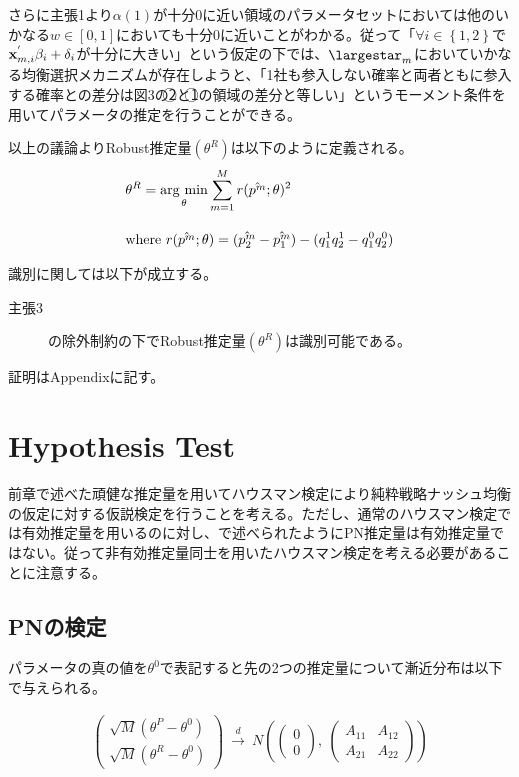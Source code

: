 \documentclass{jsarticle}
\newcommand{\argmin}{\mathop{\rm arg~min}\limits}
\begin{document}
さらに主張1より$\alpha(1)$が十分0に近い領域のパラメータセットにおいては他のいかなる$w \in [0,1]$においても十分0に近いことがわかる。従って「$\forall i \in \left\{ 1,2\right\}$で${\bf x}_{m, i}^{'} \beta_i + \delta_i$が十分に大きい」という仮定の下では、$\largestar_m$においていかなる均衡選択メカニズムが存在しようと、「1社も参入しない確率と両者ともに参入する確率との差分は図3の\textcircled{\scriptsize 2}と\textcircled{\scriptsize 1}の領域の差分と等しい」というモーメント条件を用いてパラメータの推定を行うことができる。

以上の議論よりRobust推定量$(\theta^R)$は以下のように定義される。
\begin{align*}
	&\theta^R = \argmin_{\theta} \sum_{m = 1}^M r(\hat{p^m} ; \theta)^2\\[10pt]
	&\text{where}\ r(\hat{p^m} ; \theta) = (\hat{p_2^m} - \hat{p_1^m}) - (q_1^1 q_2^1 - q_1^0 q_2^0)
\end{align*}

識別に関しては以下が成立する。
\begin{description}
	\item[主張3] \cite{Tamer2003a}の除外制約の下でRobust推定量$(\theta^R)$は識別可能である。
\end{description}
証明はAppendixに記す。


\section{Hypothesis Test}
前章で述べた頑健な推定量を用いてハウスマン検定により純粋戦略ナッシュ均衡の仮定に対する仮説検定を行うことを考える。ただし、通常のハウスマン検定では有効推定量を用いるのに対し、\cite{Tamer2003a}で述べられたようにPN推定量は有効推定量ではない。従って非有効推定量同士を用いたハウスマン検定を考える必要があることに注意する。

\subsection{PNの検定}
パラメータの真の値を$\theta^0$で表記すると先の2つの推定量について漸近分布は以下で与えられる。

\begin{align*}
	\begin{pmatrix}
	\sqrt{M}(\theta^P - \theta^0)\\[8pt]
	\sqrt{M}(\theta^R - \theta^0)
	\end{pmatrix}\ \xrightarrow{d}\ 
	N\left( \begin{pmatrix}0\\[8pt]0
	\end{pmatrix},\ 
	\begin{pmatrix}
	A_{11} & A_{12}\\[8pt]
	A_{21} & A_{22}
	\end{pmatrix}
	\right)
\end{align*}
\end{document}
